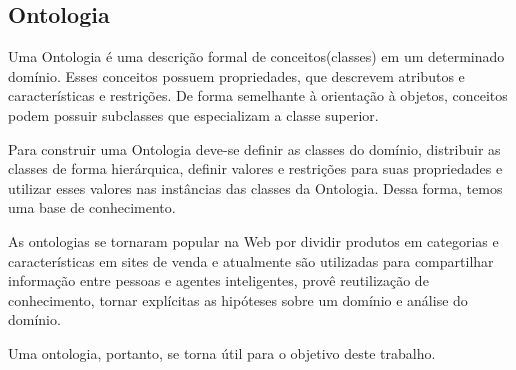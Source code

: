 \subsection{Ontologia}
Uma Ontologia é uma descrição formal de conceitos(classes) em um determinado domínio. Esses conceitos possuem propriedades, que descrevem atributos e características e restrições. De forma semelhante à orientação à objetos, conceitos podem possuir subclasses que especializam a classe superior.

Para construir uma Ontologia deve-se definir as classes do domínio, distribuir as classes de forma hierárquica, definir valores e restrições para suas propriedades e utilizar esses valores nas instâncias das classes da Ontologia. Dessa forma, temos uma base de conhecimento.

As ontologias se tornaram popular na Web por dividir produtos em categorias e características em sites de venda e atualmente são utilizadas para compartilhar informação entre pessoas e agentes inteligentes, provê reutilização de conhecimento, tornar explícitas as hipóteses sobre um domínio e análise do domínio.

Uma ontologia, portanto, se torna útil para o objetivo deste trabalho.
